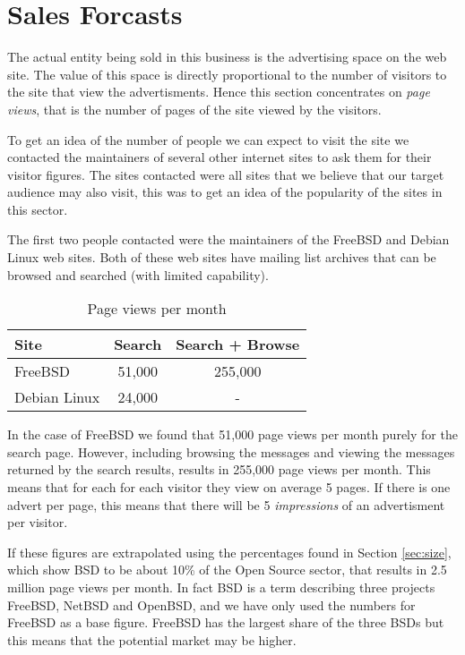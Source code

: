\section{Sales Forcasts}

The actual entity being sold in this business is the advertising space on the web site.  The value of this space is directly proportional to the number of visitors to the site that view the advertisments.  Hence this section concentrates on \emph{page views}, that is the number of pages of the site viewed by the visitors.

To get an idea of the number of people we can expect to visit the site we contacted the maintainers of several other internet sites to ask them for their visitor figures.  The sites contacted were all sites that we believe that our target audience may also visit, this was to get an idea of the popularity of the sites in this sector.

The first two people contacted were the maintainers of the FreeBSD and Debian Linux web sites.  Both of these web sites have mailing list archives that can be browsed and searched (with limited capability).

\begin{table}[!htb]
\begin{center}
\begin{tabular}{|l|c|c|}
\hline
Site & Search & Search + Browse \\
\hline
FreeBSD  &  51,000 & 255,000 \\
Debian Linux & 24,000 & - \\
\hline
\end{tabular}
\caption{Page views per month}
\end{center}
\end{table}

In the case of FreeBSD we found that 51,000 page views per month purely for the search page.  However, including browsing the messages and viewing the messages returned by the search results, results in 255,000 page views per month.  This means that for each for each visitor they view on average 5 pages.  If there is one advert per page, this means that there will be 5 \emph{impressions} of an advertisment per visitor.

If these figures are extrapolated using the percentages found in Section \ref{sec:size}, which show BSD to be about 10\% of the Open Source sector, that results in 2.5 million page views per month.  In fact BSD is a term describing three projects FreeBSD, NetBSD and OpenBSD, and we have only used the numbers for FreeBSD as a base figure.  FreeBSD has the largest share of the three BSDs but this means that the potential market may be higher.


